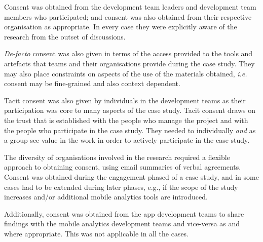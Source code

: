
Consent was obtained from the development team leaders and development team members who participated; and consent was also obtained from their respective organisation as appropriate. In every case they were explicitly aware of the research from the outset of discussions.

\textit{De-facto} consent was also given in terms of the access provided to the tools and artefacts that teams and their organisations provide during the case study. They may also place constraints on aspects of the use of the materials obtained, \textit{i.e.} consent may be fine-grained and also context dependent.

Tacit consent was also given by individuals in the development teams as their participation was core to many aspects of the case study. Tacit consent draws on the trust that is established with the people who manage the project and with the people who participate in the case study. They needed to individually \textit{and} as a group see value in the work in order to actively participate in the case study.

The diversity of organisations involved in the research required a flexible approach to obtaining consent, using email summaries of verbal agreements. Consent was obtained during the engagement phased of a case study, and in some cases had to be extended during later phases, e.g., if the scope of the study increases and/or additional mobile analytics tools are introduced.

Additionally, consent was obtained from the app development teams to share findings with the mobile analytics development teams and vice-versa as and where appropriate. This was not applicable in all the cases.



